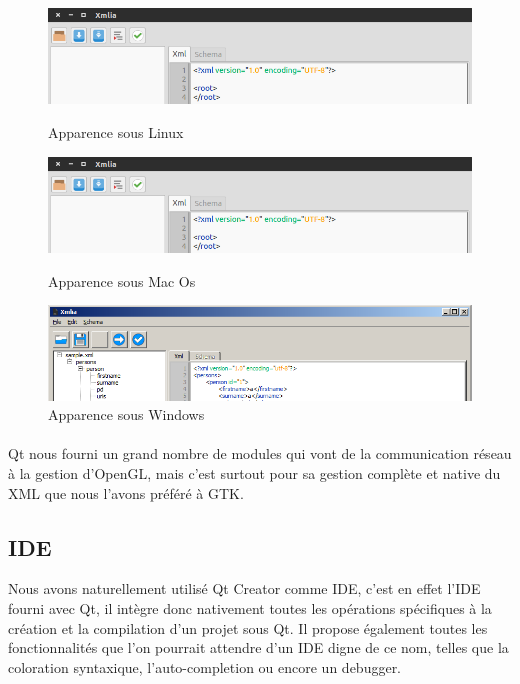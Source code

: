 \begin{figure}[h!]
\begin{minipage}[b]{\linewidth}
\centering \includegraphics[scale=0.5]{images/apparence_linux.png}
\caption{Apparence sous Linux}
\label{apparence_linux}
\end{minipage}
\begin{minipage}[b]{\linewidth}   
\centering \includegraphics[scale=0.5]{images/apparence_linux.png}
\caption{Apparence sous Mac Os}
\label{apparence_mac}
\end{minipage}
\begin{minipage}[b]{\linewidth}
\centering \includegraphics[scale=0.5]{images/apparence_windows.png}
\caption{Apparence sous Windows}
\label{apparence_windows}
\end{minipage}
\end{figure}

\paragraph{}
Qt nous fourni un grand nombre de modules qui vont de la communication réseau à la gestion d'OpenGL, mais c'est surtout pour sa gestion complète et native du XML que nous l'avons préféré à GTK.

\subsection{IDE}
Nous avons naturellement utilisé Qt Creator comme IDE, c'est en effet l'IDE fourni avec Qt, il intègre donc nativement toutes les opérations spécifiques à la création et la compilation d'un projet sous Qt. Il propose également toutes les fonctionnalités que l'on pourrait attendre d'un IDE digne de ce nom, telles que la coloration syntaxique, l'auto-completion ou encore un debugger.
